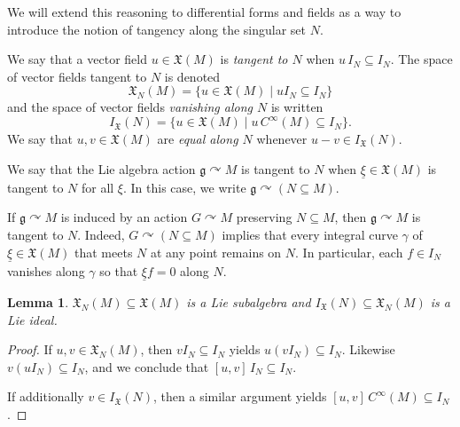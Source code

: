 \documentclass[10pt,a4paper]{amsart}
\numberwithin{equation}{section}
\newtheorem{Lemma}[Theorem]{Lemma}
\newcommand{\g}{\mathfrak{g}}
\newcommand{\tgtvf}{\mathfrak X_N(M)}
\newcommand{\X}{\mathfrak{X}}
\renewcommand{\subset}{\subseteq}
\begin{document}
We will extend this reasoning to differential forms and fields as a way to introduce the notion of tangency along the singular set $N$.



\begin{Definition}\label{def:tangentvf}
	We say that a vector field $u \in \mathfrak{X}(M)$ is \emph{tangent to $N$} when $u\, I_N\subset I_N$. The space of vector fields tangent to $N$ is denoted
	\begin{displaymath}
		\mathfrak{X}_N(M) =
		\lbrace
		u \in \mathfrak{X}(M)
		\mid
		u  I_N \subset I_N
		\rbrace
	\end{displaymath}	
	and the space of vector fields \emph{vanishing along $N$} is written
	\begin{displaymath}
		I_{\mathfrak{X}}(N) =
		\lbrace
		u \in \mathfrak{X}(M)
		\mid
		u \, C^\infty(M) \subset I_N
		\rbrace.
	\end{displaymath}
	We say that $u,v\in\X(M)$ are \emph{equal along $N$} whenever $u-v\in I_\X(N)$.
\end{Definition}

\begin{Definition}\label{def:Lie_algebra_action_tangent_to_N}
	We say that the Lie algebra action $\g\curvearrowright M$ is tangent to $N$ when $\underline\xi\in\X(M)$ is tangent to $N$ for all $\xi$. In this case, we write $\g\curvearrowright(N\subset M)$.
\end{Definition}

\begin{Remark}\label{rem:group_preservation_is_sufficient_for_tangency}
	If $\g\curvearrowright M$ is induced by an action $G\curvearrowright M$ preserving $N\subset M$, then $\g\curvearrowright M$ is tangent to $N$. Indeed, $G\curvearrowright(N\subset M)$ implies that every integral curve $\gamma$ of $\underline\xi\in\X(M)$ that meets $N$ at any point remains on $N$. In particular, each $f\in I_N$ vanishes along $\gamma$ so that $\underline\xi f=0$ along $N$.
\end{Remark}

\begin{Lemma}\label{lem:tangent_to_N_Lie_subalgebra}
	$\tgtvf\subset \X(M)$ is a Lie subalgebra and $I_{\mathfrak{X}}(N)\subset\X_N(M)$ is a Lie ideal.
\end{Lemma}

\begin{proof}
	If $u,v\in\X_N(M)$, then $v I_N\subset I_N$ yields $u(vI_N)\subset I_N$. Likewise $v(uI_N)\subset I_N$, and we conclude that $[u,v]\,I_N\subset I_N$.

	If additionally $v\in I_\X(N)$, then a similar argument yields $[u,v]\,C^\infty(M)\subset I_N$.
\end{proof}
\end{document}
